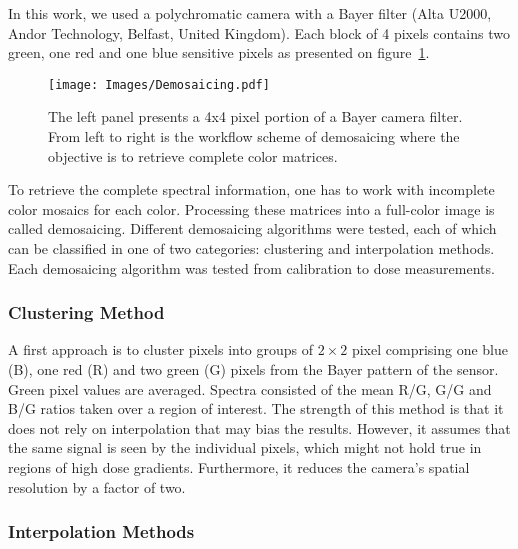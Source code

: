 \documentclass[12pt]{iopart}
\begin{document}
In this work, we used a polychromatic camera with a Bayer filter (Alta U2000, Andor Technology, Belfast, United Kingdom). Each block of 4 pixels contains two green, one red and one blue sensitive pixels as presented on figure~\ref{fig:demosaicing}.
\begin{figure}[ht]
    \centering
    \texttt{[image: Images/Demosaicing.pdf]}
    \caption{The left panel presents a 4x4 pixel portion of a Bayer camera filter. From left to right is the workflow scheme of demosaicing where the objective is to retrieve complete color matrices. }
    \label{fig:demosaicing}
\end{figure}
To retrieve the complete spectral information, one has to work with incomplete color mosaics for each color. Processing these matrices into a full-color image is called demosaicing. Different demosaicing algorithms were tested, each of which can be classified in one of two categories: clustering and interpolation methods. Each demosaicing algorithm was tested from calibration to dose measurements. 

\subsubsection{Clustering Method}

A first approach is to cluster pixels into groups of $2\times2$ pixel comprising one blue (B), one red (R) and two green (G) pixels from the Bayer pattern of the sensor. Green pixel values are averaged. Spectra consisted of the mean R/G, G/G and B/G ratios taken over a region of interest. The strength of this method is that it does not rely on interpolation that may bias the results. However, it assumes that the same signal is seen by the individual pixels, which might not hold true in regions of high dose gradients. Furthermore, it reduces the camera's spatial resolution by a factor of two.

\subsubsection{Interpolation Methods}
\end{document}
